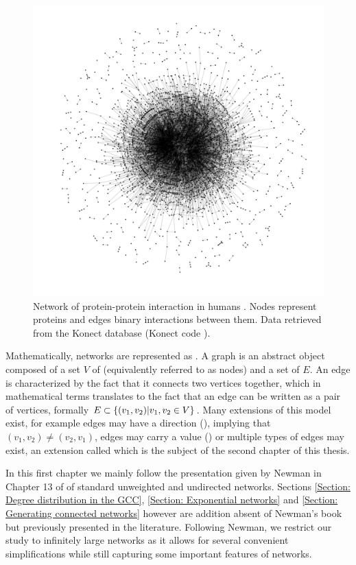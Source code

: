 \documentclass[
11pt, %
american, %
singlespacing, %
final, %
nolistspacing, %
liststotoc, %
headsepline, %
]{MastersDoctoralThesis} %
\begin{document}
\begin{figure}
	\includegraphics[width=\textwidth]{network-maayan-vidal.pdf}
	\caption{Network of protein-protein interaction in humans \cite{rual2005towards}. Nodes represent proteins and edges binary interactions between them. Data retrieved from the Konect database \cite{kunegis2013konect} (Konect code ).}
	\label{Figure: Network of human proteins}
\end{figure}

Mathematically, networks are represented as . A graph is an abstract object composed of a set $V$ of  (equivalently referred to as nodes) and a set of  $E$. An edge is characterized by the fact that it connects two vertices together, which in mathematical terms translates to the fact that an edge can be written as a pair of vertices, formally $E \subset \{(v_1, v_2) | v_1, v_2 \in V \}$. Many extensions of this model exist, for example edges may have a direction (), implying that $(v_1, v_2) \neq (v_2, v_1)$, edges may carry a value () or multiple types of edges may exist, an extension called  which is the subject of the second chapter of this thesis.

In this first chapter we mainly follow the presentation given by Newman in Chapter 13 of \cite{newman2010networks} of standard unweighted and undirected networks. Sections \ref{Section: Degree distribution in the GCC}, \ref{Section: Exponential networks} and \ref{Section: Generating connected networks} however are addition absent of Newman's book but previously presented in the literature. Following Newman, we restrict our study to infinitely large networks as it allows for several convenient simplifications while still capturing some important features of networks.
\end{document}
